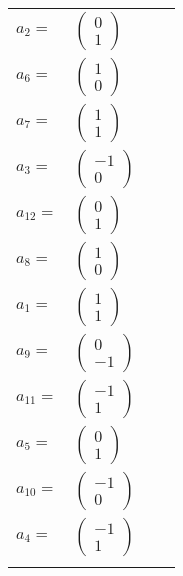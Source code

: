 \documentclass[1p]{elsarticle_modified}
\theoremstyle{definition}
\begin{document}
\begin{tabular}{m{7pt} m{180pt} m{7pt} m{180pt} }
\flushright $a_{2}=$&$\begin{pmatrix}0\\1\end{pmatrix}$ \\
\flushright $a_{6}=$&$\begin{pmatrix}1\\0\end{pmatrix}$ \\
\flushright $a_{7}=$&$\begin{pmatrix}1\\1\end{pmatrix}$ \\
\flushright $a_{3}=$&$\begin{pmatrix}-1\\0\end{pmatrix}$ \\
\flushright $a_{12}=$&$\begin{pmatrix}0\\1\end{pmatrix}$ \\
\flushright $a_{8}=$&$\begin{pmatrix}1\\0\end{pmatrix}$ \\
\flushright $a_{1}=$&$\begin{pmatrix}1\\1\end{pmatrix}$ \\
\flushright $a_{9}=$&$\begin{pmatrix}0\\-1\end{pmatrix}$ \\
\flushright $a_{11}=$&$\begin{pmatrix}-1\\1\end{pmatrix}$ \\
\flushright $a_{5}=$&$\begin{pmatrix}0\\1\end{pmatrix}$ \\
\flushright $a_{10}=$&$\begin{pmatrix}-1\\0\end{pmatrix}$ \\
\flushright $a_{4}=$&$\begin{pmatrix}-1\\1\end{pmatrix}$\\&\end{tabular}
\end{document}

